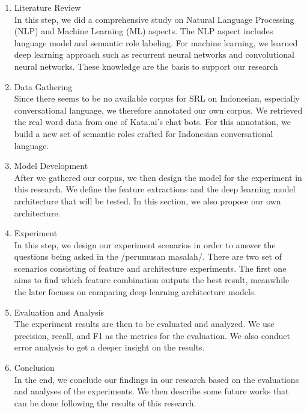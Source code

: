 \begin{enumerate}
	\item Literature Review\\
	In this step, we did a comprehensive study on Natural Language Processing (NLP) and Machine Learning (ML) aspects. The NLP aspect includes language model and semantic role labeling. For machine learning, we learned deep learning approach such as recurrent neural networks and convolutional neural networks. These knowledge are the basis to support our research
	
	\item Data Gathering\\
	Since there seems to be no available corpus for SRL on Indonesian, especially conversational language, we therefore annotated our own corpus. We retrieved the real word data from one of Kata.ai's chat bots. For this annotation, we build a new set of semantic roles crafted for Indonesian conversational language.
	
	\item Model Development\\
	After we gathered our corpus, we then design the model for the experiment in this research. We define the feature extractions and the deep learning model architecture that will be tested. In this section, we also propose our own architecture.
		
	\item Experiment \\
	In this step, we design our experiment scenarios in order to answer the questions being asked in the /perumusan masalah/. There are two set of scenarios consisting of feature and architecture experiments. The first one aims to find which feature combination outputs the best result, meanwhile the later focuses on comparing deep learning architecture models.
	
	\item Evaluation and Analysis \\
	The experiment results are then to be evaluated and analyzed. We use precision, recall, and F1 as the metrics for the evaluation. We also conduct error analysis to get a deeper insight on the results.
	
	\item Conclusion \\
	In the end, we conclude our findings in our research based on the evaluations and analyses of the experiments. We then describe some future works that can be done following the results of this research.
\end{enumerate}

